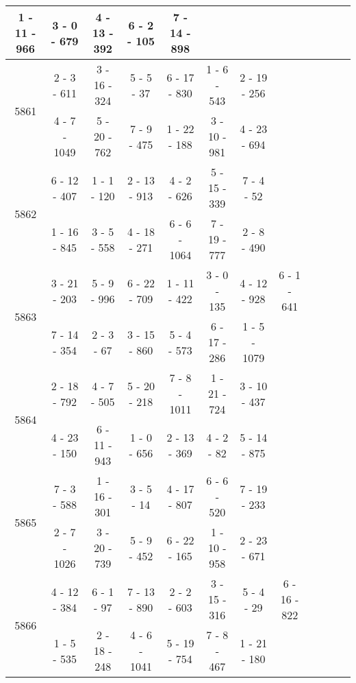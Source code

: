 \begin{longtable}{c | c | c | c | c | c | c | c | c | c | c | c}
1 - 11 - 966
&
3 - 0 - 679
&
4 - 13 - 392
&
6 - 2 - 105
&
7 - 14 - 898
&\space\\\hline
\multirow{2}{*}{5861}
& 2 - 3 - 611
&
3 - 16 - 324
&
5 - 5 - 37
&
6 - 17 - 830
&
1 - 6 - 543
&
2 - 19 - 256
&\space\\* \space
&
4 - 7 - 1049
&
5 - 20 - 762
&
7 - 9 - 475
&
1 - 22 - 188
&
3 - 10 - 981
&
4 - 23 - 694
&\space\\\hline
\multirow{2}{*}{5862}
& 6 - 12 - 407
&
1 - 1 - 120
&
2 - 13 - 913
&
4 - 2 - 626
&
5 - 15 - 339
&
7 - 4 - 52
&\space\\* \space
&
1 - 16 - 845
&
3 - 5 - 558
&
4 - 18 - 271
&
6 - 6 - 1064
&
7 - 19 - 777
&
2 - 8 - 490
&\space\\\hline
\multirow{2}{*}{5863}
& 3 - 21 - 203
&
5 - 9 - 996
&
6 - 22 - 709
&
1 - 11 - 422
&
3 - 0 - 135
&
4 - 12 - 928
&
6 - 1 - 641
\\* \space
&
7 - 14 - 354
&
2 - 3 - 67
&
3 - 15 - 860
&
5 - 4 - 573
&
6 - 17 - 286
&
1 - 5 - 1079
&\space\\\hline
\multirow{2}{*}{5864}
& 2 - 18 - 792
&
4 - 7 - 505
&
5 - 20 - 218
&
7 - 8 - 1011
&
1 - 21 - 724
&
3 - 10 - 437
&\space\\* \space
&
4 - 23 - 150
&
6 - 11 - 943
&
1 - 0 - 656
&
2 - 13 - 369
&
4 - 2 - 82
&
5 - 14 - 875
&\space\\\hline
\multirow{2}{*}{5865}
& 7 - 3 - 588
&
1 - 16 - 301
&
3 - 5 - 14
&
4 - 17 - 807
&
6 - 6 - 520
&
7 - 19 - 233
&\space\\* \space
&
2 - 7 - 1026
&
3 - 20 - 739
&
5 - 9 - 452
&
6 - 22 - 165
&
1 - 10 - 958
&
2 - 23 - 671
&\space\\\hline
\multirow{2}{*}{5866}
& 4 - 12 - 384
&
6 - 1 - 97
&
7 - 13 - 890
&
2 - 2 - 603
&
3 - 15 - 316
&
5 - 4 - 29
&
6 - 16 - 822
\\* \space
&
1 - 5 - 535
&
2 - 18 - 248
&
4 - 6 - 1041
&
5 - 19 - 754
&
7 - 8 - 467
&
1 - 21 - 180
&\space\\\hline

\end{longtable}
